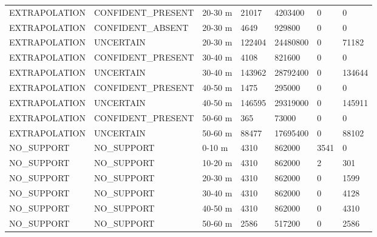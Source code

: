 \begin{table}[ht]
\begin{tabular}{lllllll}
EXTRAPOLATION & CONFIDENT\_PRESENT & 20-30 m & 21017 & 4203400 & 0 & 0 \\
EXTRAPOLATION & CONFIDENT\_ABSENT & 20-30 m & 4649 & 929800 & 0 & 0 \\
EXTRAPOLATION & UNCERTAIN & 20-30 m & 122404 & 24480800 & 0 & 71182 \\
EXTRAPOLATION & CONFIDENT\_PRESENT & 30-40 m & 4108 & 821600 & 0 & 0 \\
EXTRAPOLATION & UNCERTAIN & 30-40 m & 143962 & 28792400 & 0 & 134644 \\
EXTRAPOLATION & CONFIDENT\_PRESENT & 40-50 m & 1475 & 295000 & 0 & 0 \\
EXTRAPOLATION & UNCERTAIN & 40-50 m & 146595 & 29319000 & 0 & 145911 \\
EXTRAPOLATION & CONFIDENT\_PRESENT & 50-60 m & 365 & 73000 & 0 & 0 \\
EXTRAPOLATION & UNCERTAIN & 50-60 m & 88477 & 17695400 & 0 & 88102 \\
NO\_SUPPORT & NO\_SUPPORT & 0-10 m & 4310 & 862000 & 3541 & 0 \\
NO\_SUPPORT & NO\_SUPPORT & 10-20 m & 4310 & 862000 & 2 & 301 \\
NO\_SUPPORT & NO\_SUPPORT & 20-30 m & 4310 & 862000 & 0 & 1599 \\
NO\_SUPPORT & NO\_SUPPORT & 30-40 m & 4310 & 862000 & 0 & 4128 \\
NO\_SUPPORT & NO\_SUPPORT & 40-50 m & 4310 & 862000 & 0 & 4310 \\
NO\_SUPPORT & NO\_SUPPORT & 50-60 m & 2586 & 517200 & 0 & 2586 \\
\bottomrule
\end{tabular}
\end{table}
